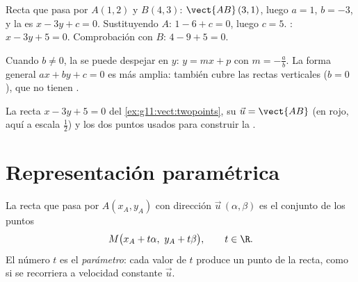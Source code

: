\begin{example}\label{ex:g11:vect:twopoints}
Recta que pasa por $A(1, 2)$ y $B(4, 3)$: $\vect{AB}\,(3, 1)$, luego
$a = 1$, $b = -3$, y la  es $x - 3y + c = 0$. Sustituyendo $A$:
$1 - 6 + c = 0$, luego $c = 5$. : $x - 3y + 5 = 0$. Comprobación
con $B$: $4 - 9 + 5 = 0$.
\end{example}

\begin{remark}
Cuando $b \neq 0$, la  se puede despejar en $y$: $y = mx + p$ con
 $m = -\frac ab$. La forma general $ax + by + c = 0$ es más
amplia: también cubre las rectas verticales ($b = 0$), que no tienen
.
\end{remark}

\begin{omfigure}

{\small La recta $x - 3y + 5 = 0$ del \cref{ex:g11:vect:twopoints}, su
 $\vec u = \vect{AB}$ (en rojo, aquí a escala $\frac12$) y
los dos puntos usados para construir la .}
\end{omfigure}

\section{Representación paramétrica}

\begin{definition}\label{def:g11:vect:parametric}
La recta que pasa por $A(x_A, y_A)$ con dirección
$\vec u\,(\alpha, \beta)$ es el conjunto de los puntos
\[
M\bigl(x_A + t\alpha,\ y_A + t\beta\bigr), \qquad t \in \R .
\]
El número $t$ es el \emph{parámetro}: cada valor de $t$ produce un punto
de la recta, como si se recorriera a velocidad constante $\vec u$.
\end{definition}

